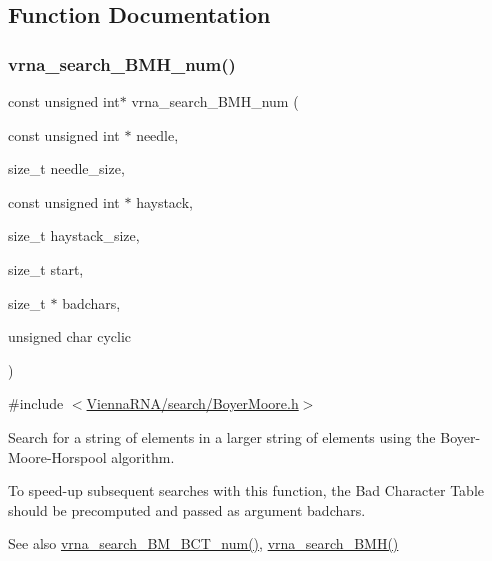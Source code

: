 \subsection{Function Documentation}
\mbox{\label{group__search__utils_ga8af89ab58905851f3dbd52624227d372}} 
\subsubsection{\texorpdfstring{vrna\_search\_BMH\_num()}{vrna\_search\_BMH\_num()}}
{\footnotesize\ttfamily const unsigned int$\ast$ vrna\+\_\+search\+\_\+\+B\+M\+H\+\_\+num (\begin{DoxyParamCaption}\item[{const unsigned int $\ast$}]{needle,  }\item[{size\+\_\+t}]{needle\+\_\+size,  }\item[{const unsigned int $\ast$}]{haystack,  }\item[{size\+\_\+t}]{haystack\+\_\+size,  }\item[{size\+\_\+t}]{start,  }\item[{size\+\_\+t $\ast$}]{badchars,  }\item[{unsigned char}]{cyclic }\end{DoxyParamCaption})}



{\ttfamily \#include $<$\mbox{\hyperlink{BoyerMoore_8h}{Vienna\+R\+N\+A/search/\+Boyer\+Moore.\+h}}$>$}



Search for a string of elements in a larger string of elements using the Boyer-\/\+Moore-\/\+Horspool algorithm. 

To speed-\/up subsequent searches with this function, the Bad Character Table should be precomputed and passed as argument {\ttfamily badchars}.

\begin{DoxySeeAlso}{See also}
\mbox{\hyperlink{group__search__utils_gad315a442e099c86c5dbf6c1c7933223d}{vrna\+\_\+search\+\_\+\+B\+M\+\_\+\+B\+C\+T\+\_\+num()}}, \mbox{\hyperlink{group__search__utils_ga72574a7cf9786d825ce73f7f7748d3c4}{vrna\+\_\+search\+\_\+\+B\+M\+H()}}
\end{DoxySeeAlso}

